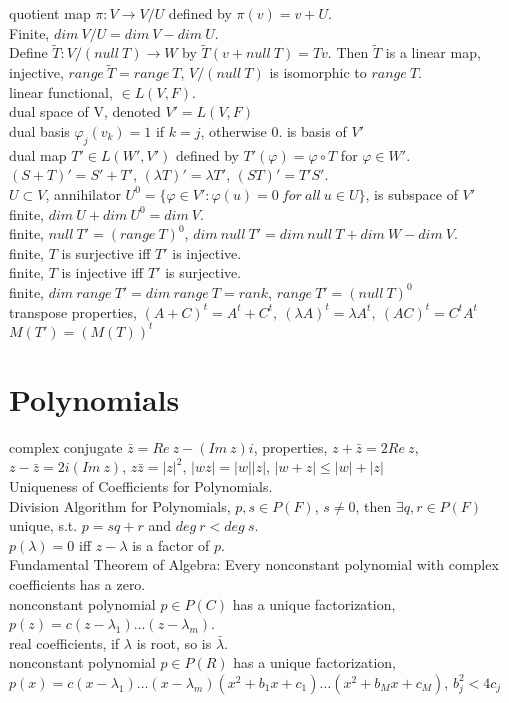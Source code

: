 \documentclass[paper=a4, fontsize=11pt]{scrartcl} %
\numberwithin{equation}{section} %
\numberwithin{figure}{section} %
\numberwithin{table}{section} %
\begin{document}
quotient map $\pi: V\rightarrow V/U$ defined by $\pi(v)=v+U$.\\
Finite, $dim\ V/U = dim\ V - dim\ U$.\\
Define $\tilde{T}: V/(null\ T) \rightarrow W$ by $\tilde{T}(v+null\ T)= Tv$. Then $\tilde{T}$ is a linear map, injective, $range\ \tilde{T} = range\ T$, $V/(null\ T)$ is isomorphic to $range\ T$.\\
linear functional, $\in L(V,F)$.\\
dual space of V, denoted $V' = L(V,F)$\\
dual basis $\varphi_j(v_k)=1$ if $k=j$, otherwise $0$. is basis of $V'$\\
dual map $T'\in L(W', V')$ defined by $T'(\varphi) = \varphi\circ T$ for $\varphi\in W'$.\\
$(S+T)'=S'+T'$, $(\lambda T)'=\lambda T'$, $(ST)'=T'S'$.\\
$U\subset V$, annihilator $U^0=\{\varphi\in V': \varphi(u)=0\ for\ all\ u\in U\}$, is subspace of $V'$\\
finite, $dim\ U+dim\ U^0 = dim\ V$.\\
finite, $null\ T' = (range\ T)^0$,  $dim\ null\ T'= dim\ null\ T+dim\ W -dim\ V$.\\
finite, $T$ is surjective iff $T'$ is injective.\\
finite, $T$ is injective iff $T'$ is surjective.\\
finite, $dim\ range\ T' = dim\ range\ T = rank$, $range\ T' =(null\ T)^0$\\
transpose properties, $(A+C)^t = A^t+C^t,\ (\lambda A)^t=\lambda A^t,\ (AC)^t=C^tA^t$\\
$M(T')=(M(T))^t$

\section{Polynomials}
complex conjugate $\bar{z}=Re\ z - (Im\ z)i$, properties, $z+\bar{z}=2Re\ z$, $z-\bar{z}=2i(Im\ z)$, $z\bar{z}=|z|^2$, $|wz|=|w||z|$, $|w+z|\leq|w|+|z|$\\
Uniqueness of Coefficients for Polynomials.\\
Division Algorithm for Polynomials, $p,s\in P(F)$, $s\neq 0$, then $\exists q,r\in P(F)$ unique, s.t. $p=sq+r$ and $deg\ r < deg\ s$.\\
$p(\lambda)=0$ iff $z-\lambda$ is a factor of $p$.\\
Fundamental Theorem of Algebra: Every nonconstant polynomial with complex coefficients has a zero.\\
nonconstant polynomial $p\in P(C)$ has a unique factorization, $p(z)=c(z-\lambda_1)\dots(z-\lambda_m)$.\\
real coefficients, if $\lambda$ is root, so is $\bar{\lambda}$.\\
nonconstant polynomial $p\in P(R)$ has a unique factorization, $p(x)=c(x-\lambda_1)\dots(x-\lambda_m)(x^2+b_1x+c_1)\dots(x^2+b_Mx+c_M)$, $b_j^2<4c_j$
\end{document}
